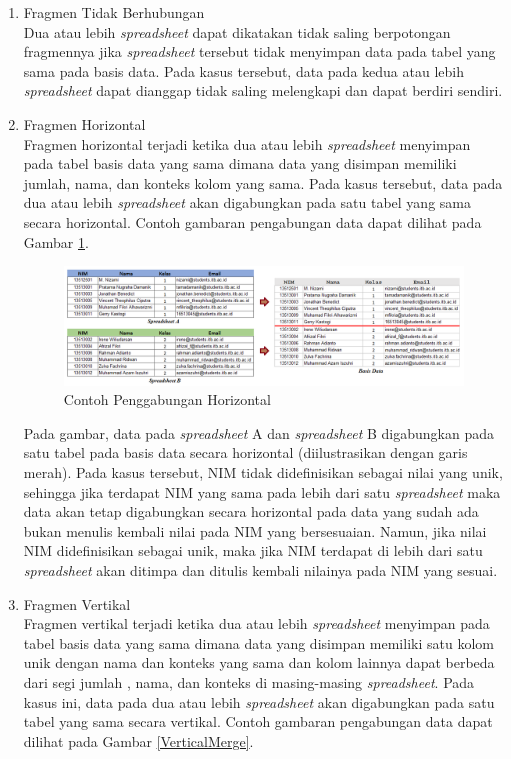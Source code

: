 \begin{enumerate}
	\item Fragmen Tidak Berhubungan\\
	Dua atau lebih \textit{spreadsheet} dapat dikatakan tidak saling berpotongan fragmennya jika \textit{spreadsheet} tersebut tidak menyimpan data pada tabel yang sama pada basis data. Pada kasus tersebut, data pada kedua atau lebih \textit{spreadsheet} dapat dianggap tidak saling melengkapi dan dapat berdiri sendiri.
	
	\item Fragmen Horizontal\\
	Fragmen horizontal terjadi ketika dua atau lebih \textit{spreadsheet} menyimpan pada tabel basis data yang sama dimana data yang disimpan memiliki jumlah, nama, dan konteks kolom yang sama. Pada kasus tersebut, data pada dua atau lebih \textit{spreadsheet} akan digabungkan pada satu tabel yang sama secara horizontal. Contoh gambaran pengabungan data dapat dilihat pada Gambar \ref{HorizontalMerge}.

	\begin{figure}[!htb]
	    \centering
	    \includegraphics[width=1\textwidth]{resources/chapter-3-horizontal-merge.png}
	    \caption{Contoh Penggabungan Horizontal}
		\label{HorizontalMerge}
	\end{figure}

	Pada gambar, data pada \textit{spreadsheet} A dan \textit{spreadsheet} B digabungkan pada satu tabel pada basis data secara horizontal (diilustrasikan dengan garis merah). Pada kasus tersebut, NIM tidak didefinisikan sebagai nilai yang unik, sehingga jika terdapat NIM yang sama pada lebih dari satu \textit{spreadsheet} maka data akan tetap digabungkan secara horizontal pada data yang sudah ada bukan menulis kembali nilai pada NIM yang bersesuaian. Namun, jika nilai NIM didefinisikan sebagai unik, maka jika NIM terdapat di lebih dari satu \textit{spreadsheet} akan ditimpa dan ditulis kembali nilainya pada NIM yang sesuai.

	\item Fragmen Vertikal\\
	Fragmen vertikal terjadi ketika dua atau lebih \textit{spreadsheet} menyimpan pada tabel basis data yang sama dimana data yang disimpan memiliki satu kolom unik dengan nama dan konteks yang sama dan kolom lainnya dapat berbeda dari segi jumlah , nama, dan konteks di masing-masing \textit{spreadsheet}. Pada kasus ini, data pada dua atau lebih \textit{spreadsheet} akan digabungkan pada satu tabel yang sama secara vertikal. Contoh gambaran pengabungan data dapat dilihat pada Gambar \ref{VerticalMerge}.


\end{enumerate}
